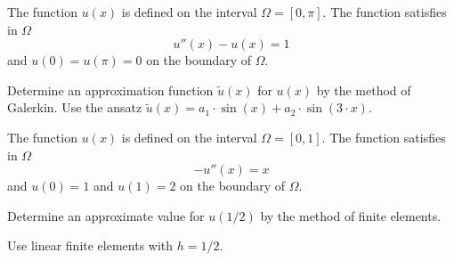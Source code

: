 \begin{teilaufgaben}
\item
The function $u(x)$ is defined on the interval $\Omega = [0, \pi].$
The function satisfies in $\Omega$ 
\[
u''(x) - u(x) = 1
\]
and $u(0) = u(\pi) = 0$ on the boundary of $\Omega$.

Determine an approximation function $\tilde u(x)$ for $u(x)$ by
the method of Galerkin. 
Use the ansatz $\tilde u(x) = a_1 \cdot \sin(x) + a_2 \cdot \sin(3 \cdot x).$

\item
The function $u(x)$ is defined on the interval $\Omega = [0, 1].$
The function satisfies in $\Omega$ 
\[
- u''(x) = x
\]
and $u(0) = 1$ and $u(1) = 2$ on the boundary of $\Omega$.  

Determine an approximate value for $u(1/2)$ by the method of finite elements.

Use linear finite elements with $h = 1/2$.
\end{teilaufgaben}

